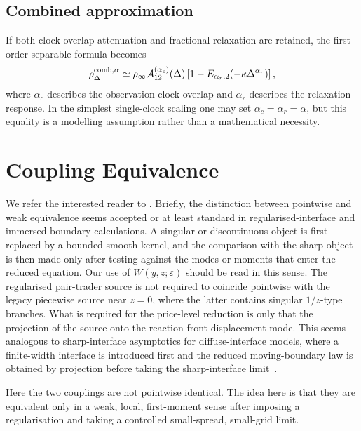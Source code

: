 \documentclass[5p,final]{elsarticle}
\begin{document}
\subsection{Combined approximation}

If both clock-overlap attenuation and fractional relaxation are retained, the first-order separable formula becomes
\begin{equation}
\rho^{\rm comb,\alpha}_\Delta
\simeq
\rho_\infty\mathcal A_{12}^{(\alpha_c)}(\Delta)
\left[1-E_{\alpha_r,2}(-\kappa\Delta^{\alpha_r})\right],
\end{equation}
where $\alpha_c$ describes the observation-clock overlap and $\alpha_r$ describes the relaxation response.  In the simplest single-clock scaling one may set $\alpha_c=\alpha_r=\alpha$, but this equality is a modelling assumption rather than a mathematical necessity.

\section{Coupling Equivalence}\label{app:coupling-equivalence}

We refer the interested reader to \cite{ElderGrantProvatasKosterlitz2001,Peskin2002,OlssonKreiss2005,DesjardinsMoureauPitsch2008}. Briefly, the distinction between pointwise and weak equivalence seems accepted or at least standard in regularised-interface and immersed-boundary calculations. A singular or discontinuous object is first replaced by a bounded smooth kernel, and the comparison with the sharp object is then made only after testing against the modes or moments that enter the reduced equation. Our use of \(W(y,z;\varepsilon)\) should be read in this sense. The regularised pair-trader source is not required to coincide pointwise with the legacy
piecewise source near \(z=0\), where the latter contains singular \(1/z\)-type branches.  What is required for the price-level reduction is only that the projection of the source onto the reaction-front displacement mode. This seems analogous to sharp-interface asymptotics for diffuse-interface models, where a finite-width interface is introduced first and the reduced moving-boundary law is obtained by projection before taking the sharp-interface limit~\cite{ElderGrantProvatasKosterlitz2001}.

Here the two couplings are not pointwise identical.  The idea here is that they are equivalent only in a weak, local, first-moment sense after imposing a regularisation and taking a controlled small-spread, small-grid limit. 
\end{document}
